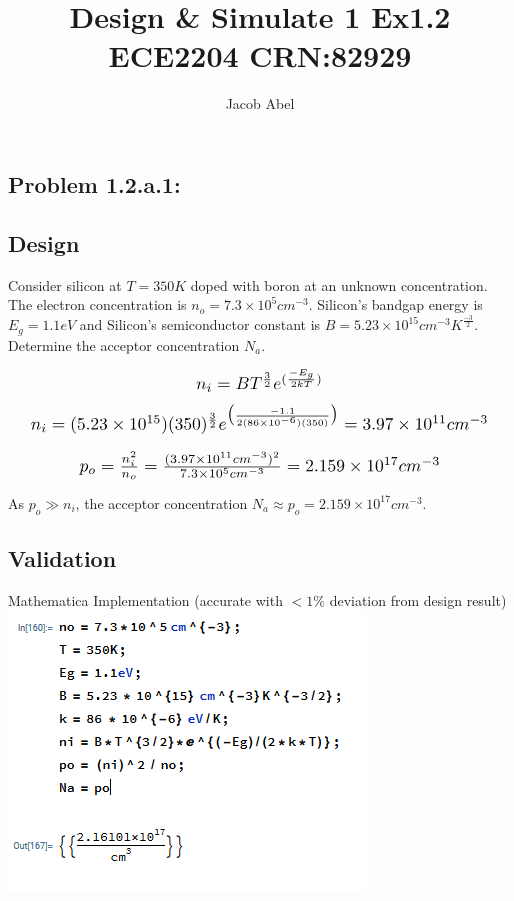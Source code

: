 \documentclass[12pt,letterpaper,titlepage]{article}
\author{Jacob Abel}
\title{	Design \& Simulate 1 Ex1.2
	\\\large ECE2204 CRN:82929
}
\begin{document}
\maketitle
\begin{raggedright}

\section{Problem 1.2.a.1: }
\subsection{Design}

Consider silicon at $T = 350K$ doped with boron at an unknown concentration. The electron concentration is $n_o = 7.3 \times 10^5 cm^{-3}$. Silicon's bandgap energy is $E_g = 1.1eV$ and Silicon's semiconductor constant is $B = 5.23 \times 10^{15} cm^{-3}K^{\frac{-3}{2}}$. Determine the acceptor concentration $N_a$.

\begin{equation}\scalebox{1.25}{
$
n_i = BT^{\frac{3}{2}}e^{(\frac{-E_g}{2kT})} 
$
}
\end{equation}
\begin{equation}\scalebox{1.25}{
$
n_i = (5.23\times 10^{15})(350)^{\frac{3}{2}}e^{
	\big(\frac{-1.1}{
		2(86\times 10^{-6})(350)
	}\big)
	} 
	= 3.97\times 10^{11} cm^{-3}
$
}
\end{equation}
	
\begin{equation}\scalebox{1.25}{
$
p_o = \frac{n_i^2}{n_o} 
	= \frac{
	(3.97\times 10^{11} cm^{-3})^2
}{
	7.3 \times 10^5 cm^{-3}
}
	= 2.159 \times 10^{17} cm^{-3}
$
}
\end{equation}

As $p_o \gg n_i$, the acceptor concentration $N_a \approx p_o = 2.159 \times 10^{17} cm^{-3}$.

\pagebreak
\subsection{Validation}

\begin{center}
Mathematica Implementation (accurate with $< 1\%$ deviation from design result)
\includegraphics[width=.5\textwidth, height=\textheight, keepaspectratio=true]{ds1a}
\end{center}


\end{raggedright}
\end{document}
